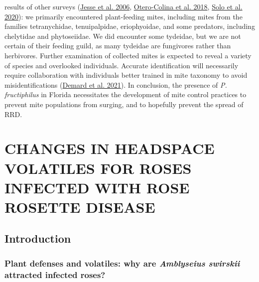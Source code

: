 \documentclass{ufdissertation}[overrideChapters] %
\begin{document}
{results of other surveys (\protect\hyperlink{ref-Jesse2006}{Jesse et al. 2006}, \protect\hyperlink{ref-Otero-Colina2018}{Otero-Colina et al. 2018}, \protect\hyperlink{ref-Solo2020}{Solo et al. 2020}): we primarily encountered plant-feeding mites, including mites from the families tetranychidae, tenuipalpidae, eriophyoidae, and some predators, including chelytidae and phytoseiidae. We did encounter some tydeidae, but we are not certain of their feeding guild, as many tydeidae are fungivores rather than herbivores. Further examination of collected mites is expected to reveal a variety of species and overlooked individuals. Accurate identification will necessarily require collaboration with individuals better trained in mite taxonomy to avoid misidentifications (\protect\hyperlink{ref-Demard2021}{Demard et al. 2021}). In conclusion, the presence of \emph{P. fructiphilus} in Florida necessitates the development of mite control practices to prevent mite populations from surging, and to hopefully prevent the spread of RRD.

\hypertarget{changes-in-headspace-volatiles-for-roses-infected-with-rose-rosette-disease}{%
\chapter{CHANGES IN HEADSPACE VOLATILES FOR ROSES INFECTED WITH ROSE ROSETTE DISEASE}\label{changes-in-headspace-volatiles-for-roses-infected-with-rose-rosette-disease}}

\hypertarget{introduction-1}{%
\section{Introduction}\label{introduction-1}}

\hypertarget{plant-defenses-and-volatiles-why-are-amblyseius-swirskii-attracted-infected-roses}{%
\subsection{\texorpdfstring{Plant defenses and volatiles: why are \emph{Amblyseius swirskii} attracted infected roses?}{Plant defenses and volatiles: why are Amblyseius swirskii attracted infected roses?}}\label{plant-defenses-and-volatiles-why-are-amblyseius-swirskii-attracted-infected-roses}}

}
\end{document}
